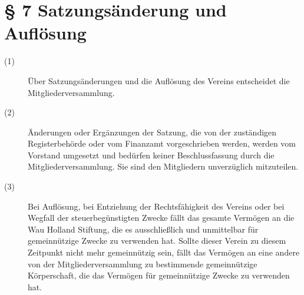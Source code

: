 \documentclass[a4paper,12pt]{scrartcl}
\begin{document}
\section*{\S{} 7 Satzungsänderung und Auflösung}
\begin{description} 

\item[(1)] Über Satzungsänderungen und die Auflösung des Vereins entscheidet die Mitgliederversammlung.
\item[(2)] Änderungen oder Ergänzungen der Satzung, die von der zuständigen Registerbehörde oder vom Finanzamt vorgeschrieben werden, werden vom Vorstand umgesetzt und bedürfen keiner Beschlussfassung durch die Mitgliederversammlung. Sie sind den Mitgliedern unverzüglich mitzuteilen.
\item[(3)] Bei Auflösung, bei Entziehung der Rechtsfähigkeit des Vereins oder bei Wegfall der steuerbegünstigten Zwecke fällt das gesamte Vermögen an die Wau Holland Stiftung, die es ausschließlich und unmittelbar für gemeinnützige Zwecke zu verwenden hat. Sollte dieser Verein zu diesem Zeitpunkt nicht mehr gemeinnützig sein, fällt das Vermögen an eine andere von der Mitgliederversammlung zu bestimmende gemeinnützige Körperschaft, die das Vermögen für gemeinnützige Zwecke zu verwenden hat.

\end{description}
\end{document}
